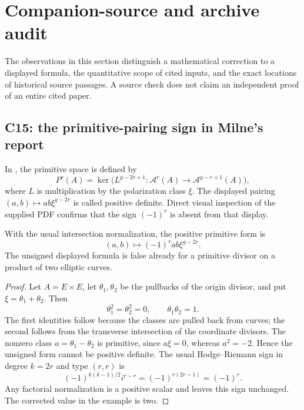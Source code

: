 \section{Companion-source and archive audit}
\label{sec:source-audit}

The observations in this section distinguish a mathematical correction to a displayed formula, the quantitative scope of cited inputs, and the exact locations of historical source passages. A source check does not claim an independent proof of an entire cited paper.

\subsection{C15: the primitive-pairing sign in Milne's report}

In \cite[\S3.6, printed and PDF p.~8]{MilneReport2026}, the primitive space is defined by
\[
P^r(A)=\ker\bigl(L^{g-2r+1}:\mathcal A^r(A)\longrightarrow
\mathcal A^{g-r+1}(A)\bigr),
\]
where $L$ is multiplication by the polarization class $\xi$. The displayed pairing $(a,b)\mapsto ab\xi^{g-2r}$ is called positive definite. Direct visual inspection of the supplied PDF confirms that the sign $(-1)^r$ is absent from that display.

\begin{proposition}
With the usual intersection normalization, the positive primitive form is
\[
(a,b)\longmapsto(-1)^r ab\xi^{g-2r}.
\]
The unsigned displayed formula is false already for a primitive divisor on a product of two elliptic curves.
\end{proposition}

\begin{proof}
Let $A=E\times E$, let $\theta_1,\theta_2$ be the pullbacks of the origin divisor, and put $\xi=\theta_1+\theta_2$. Then
\[
\theta_1^2=\theta_2^2=0,\qquad \theta_1\theta_2=1.
\]
The first identities follow because the classes are pulled back from curves; the second follows from the transverse intersection of the coordinate divisors. The nonzero class $a=\theta_1-\theta_2$ is primitive, since $a\xi=0$, whereas $a^2=-2$. Hence the unsigned form cannot be positive definite. The usual Hodge--Riemann sign in degree $k=2r$ and type $(r,r)$ is
\[
(-1)^{k(k-1)/2}i^{r-r}=(-1)^{r(2r-1)}=(-1)^r.
\]
Any factorial normalization is a positive scalar and leaves this sign unchanged. The corrected value in the example is two.
\end{proof}

